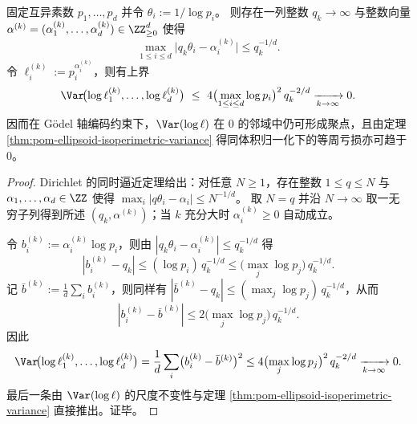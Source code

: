 \begin{proposition}\label{prop:pom-godel-axis-variance-no-gap}
固定互异素数 \(p_1,\dots,p_d\) 并令 \(\theta_i:=1/\log p_i\)。
则存在一列整数 \(q_k\to\infty\) 与整数向量 \(\alpha^{(k)}=(\alpha^{(k)}_1,\dots,\alpha^{(k)}_d)\in\ZZ_{\ge 0}^d\) 使得
\[
\max_{1\le i\le d}\bigl|q_k\theta_i-\alpha_i^{(k)}\bigr|\le q_k^{-1/d}.
\]
令 \(\ell_i^{(k)}:=p_i^{\alpha_i^{(k)}}\)，则有上界
\[
\Var\!\bigl(\log\ell^{(k)}_1,\dots,\log\ell^{(k)}_d\bigr)
\ \le\
4\bigl(\max_{1\le i\le d}\log p_i\bigr)^2\,q_k^{-2/d}\xrightarrow[k\to\infty]{}0.
\]
因而在 Gödel 轴编码约束下，\(\Var(\log\ell)\) 在 \(0\) 的邻域中仍可形成聚点，且由定理 \ref{thm:pom-ellipsoid-isoperimetric-variance} 得同体积归一化下的等周亏损亦可趋于 \(0\)。
\end{proposition}
\begin{proof}
Dirichlet 的同时逼近定理给出：对任意 \(N\ge 1\)，存在整数 \(1\le q\le N\) 与 \(\alpha_1,\dots,\alpha_d\in\ZZ\) 使得 \(\max_i|q\theta_i-\alpha_i|\le N^{-1/d}\)。\cite{Cassels1957}
取 \(N=q\) 并沿 \(N\to\infty\) 取一无穷子列得到所述 \((q_k,\alpha^{(k)})\)；当 \(k\) 充分大时 \(\alpha_i^{(k)}\ge 0\) 自动成立。
\par
令 \(b_i^{(k)}:=\alpha_i^{(k)}\log p_i\)，则由 \(|q_k\theta_i-\alpha_i^{(k)}|\le q_k^{-1/d}\) 得
\[
|b_i^{(k)}-q_k|\le (\log p_i)\,q_k^{-1/d}\le \bigl(\max_j\log p_j\bigr)\,q_k^{-1/d}.
\]
记 \(\bar b^{(k)}:=\frac1d\sum_i b_i^{(k)}\)，则同样有 \(|\bar b^{(k)}-q_k|\le (\max_j\log p_j)\,q_k^{-1/d}\)，从而
\[
|b_i^{(k)}-\bar b^{(k)}|\le 2\bigl(\max_j\log p_j\bigr)\,q_k^{-1/d}.
\]
因此
\[
\Var\!\bigl(\log\ell^{(k)}_1,\dots,\log\ell^{(k)}_d\bigr)
=\frac1d\sum_i \bigl(b_i^{(k)}-\bar b^{(k)}\bigr)^2
\le 4\bigl(\max_j\log p_j\bigr)^2\,q_k^{-2/d}\xrightarrow[k\to\infty]{}0.
\]
最后一条由 \(\Var(\log\ell)\) 的尺度不变性与定理 \ref{thm:pom-ellipsoid-isoperimetric-variance} 直接推出。证毕。
\end{proof}



